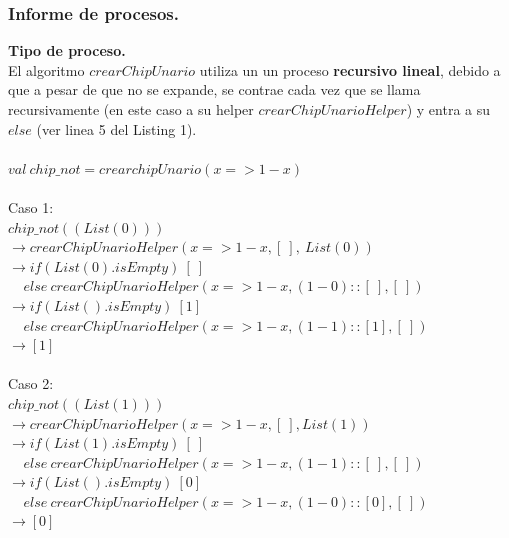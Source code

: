 \documentclass[12pt, a4paper]{article}
\begin{document}
\subsubsection{Informe de procesos.}
\textbf{Tipo de proceso.} \\ 
El algoritmo $crearChipUnario$ utiliza un un proceso \textbf{recursivo lineal}, debido a que a pesar de que no se expande, se contrae cada vez que se llama recursivamente (en este caso a su helper $crearChipUnarioHelper$) y entra a su $else$ (ver linea 5 del Listing 1). \\ \\ 
$val~chip\_not = crearchipUnario(x => 1- x)$ \\ \\
Caso 1: \\ 
$chip\_not((List(0)))$ \\
$\rightarrow crearChipUnarioHelper(x => 1 - x, [~], ~List(0))$ \\
$\rightarrow if (List(0).isEmpty)~[~] $ \\
$~~~~~else~crearChipUnarioHelper(x => 1 - x, (1 - 0)::[~], [~])$ \\
$\rightarrow if (List().isEmpty)~[1] $ \\
$~~~~~else~crearChipUnarioHelper(x => 1 - x, (1 - 1)::[1], [~])$ \\
$\rightarrow [1]$ \\ \\
Caso 2: \\ 
$chip\_not((List(1)))$ \\
$\rightarrow crearChipUnarioHelper(x => 1- x, [~], List(1))$ \\
$\rightarrow if (List(1).isEmpty)~[~] $ \\
$~~~~~else~crearChipUnarioHelper(x => 1 - x, (1 - 1)::[~], [~])$ \\
$\rightarrow if (List().isEmpty)~[0] $ \\
$~~~~~else~crearChipUnarioHelper(x => 1 - x, (1 - 0)::[0], [~])$ \\
$\rightarrow [0]$  
\end{document}
